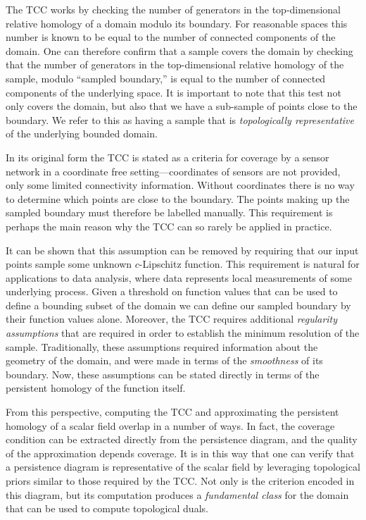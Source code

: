 
The TCC works by checking the number of generators in the top-dimensional relative homology of a domain modulo its boundary.
For reasonable spaces this number is known to be equal to the number of connected components of the domain.
One can therefore confirm that a sample covers the domain by checking that the number of generators in the top-dimensional relative homology of the sample, modulo ``sampled boundary,'' is equal to the number of connected components of the underlying space.
It is important to note that this test not only covers the domain, but also that we have a sub-sample of points close to the boundary.
We refer to this as having a sample that is \emph{topologically representative} of the underlying bounded domain.

In its original form the TCC is stated as a criteria for coverage by a sensor network in a coordinate free setting---coordinates of sensors are not provided, only some limited connectivity information.
Without coordinates there is no way to determine which points are close to the boundary.
The points making up the sampled boundary must therefore be labelled manually.
This requirement is perhaps the main reason why the TCC can so rarely be applied in practice.

It can be shown that this assumption can be removed by requiring that our input points sample some unknown $c$-Lipschitz function.
This requirement is natural for applications to data analysis, where data represents local measurements of some underlying process.
Given a threshold on function values that can be used to define a bounding subset of the domain we can define our sampled boundary by their function values alone.
Moreover, the TCC requires additional \emph{regularity assumptions} that are required in order to establish the minimum resolution of the sample.
Traditionally, these assumptions required information about the geometry of the domain, and were made in terms of the \emph{smoothness} of its boundary.
Now, these assumptions can be stated directly in terms of the persistent homology of the function itself.

From this perspective, computing the TCC and approximating the persistent homology of a scalar field overlap in a number of ways.
In fact, the coverage condition can be extracted directly from the persistence diagram, and the quality of the approximation depends coverage.
It is in this way that one can verify that a persistence diagram is representative of the scalar field by leveraging topological priors similar to those required by the TCC.
Not only is the criterion encoded in this diagram, but its computation produces a \emph{fundamental class} for the domain that can be used to compute topological duals.
